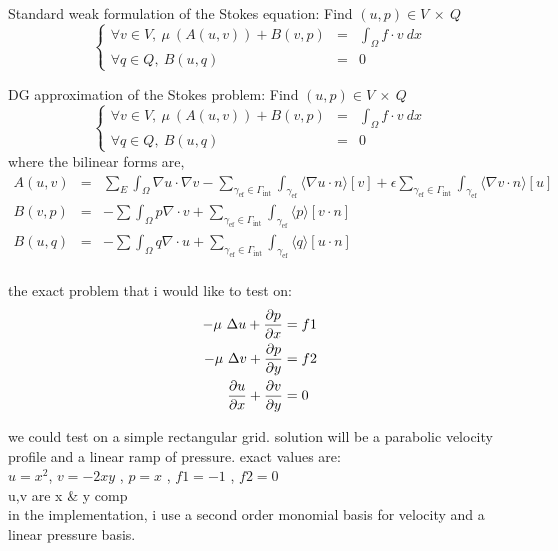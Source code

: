\documentclass[11pt,a4paper]{article}
\begin{document}
{Standard weak formulation of the Stokes equation:}
{
Find $(u,p) \in V~\times~Q $ 
$$
\left\{
  \begin{array}{lcl}
   \forall v \in V,~ \mu~(A(u,v)) + B(v,p) &=& \int_{\Omega} f \cdot v~ dx  \\
   \forall q \in Q,~ B(u,q)  &=& 0
  \end{array}
 \right.
$$
}


{DG approximation of the Stokes problem:}
{{
Find $(u,p) \in V~\times~Q $ 
$$
\left\{
  \begin{array}{lcl}
   \forall v \in V,~ \mu~(A(u,v)) + B(v,p) &=& \int_{\Omega} f \cdot v~ dx  \\
   \forall q \in Q,~ B(u,q)  &=& 0
  \end{array}
 \right.
$$
where the bilinear forms are,
\begin{eqnarray*}
A(u,v) & = & \sum\limits_E\int_\Omega \nabla u \cdot \nabla v -
\sum\limits_{\gamma_{\text{ef}} \in \Gamma_{\text{int}}} \int_{\gamma_{\text{ef}}}\langle
\nabla u \cdot n \rangle [v] + \epsilon \sum\limits_{\gamma_{\text{ef}} \in \Gamma_{\text{int}}} \int_{\gamma_{\text{ef}}} \langle \nabla v
\cdot n \rangle [u]\\
B(v,p) & = & - \sum \int_\Omega p \nabla \cdot v + \sum\limits_{\gamma_{\text{ef}} \in \Gamma_{\text{int}}} \int_{\gamma_{\text{ef}}}
\langle p \rangle [v \cdot n]\\
B(u,q) & = & - \sum \int_\Omega q \nabla \cdot u + \sum\limits_{\gamma_{\text{ef}} \in \Gamma_{\text{int}}} \int_{\gamma_{\text{ef}}}
\langle q \rangle [u \cdot n]\\ 
\end{eqnarray*}
}
}



\newpage
the exact problem that i would like to test on:\\
\begin{equation*}
\begin{aligned}
- \mu~\Delta u + {\partial p \over \partial x} &= f1\\
- \mu~\Delta v + {\partial p \over \partial y} &= f2\\
{\partial u \over \partial x}+{\partial v \over \partial y}&=0
\end{aligned}
\end{equation*}

we could test on a simple rectangular grid. solution will be a parabolic velocity profile and a linear ramp of pressure.
exact values are:\\
$u=x^2$, $v=-2xy$ , $p=x$ , $f1=-1$ , $f2=0$ \\
u,v are x \& y comp\\ 
in the implementation, i use a second order monomial basis for velocity and a linear pressure basis.\\
\end{document}
